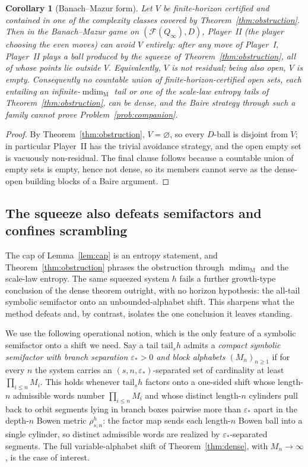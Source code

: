 \documentclass[11pt]{article}
\newtheorem{corollary}[theorem]{Corollary}
\newcommand{\Q}{Q_\infty}
\newcommand{\F}{\mathcal{F}}
\newcommand{\mdim}{\operatorname{mdim}_{\mathrm M}}
\begin{document}
\begin{corollary}[Banach--Mazur form]\label{cor:bm}
Let $V$ be finite-horizon certified and contained in one of the complexity classes covered
by Theorem~\ref{thm:obstruction}.  Then in the Banach--Mazur game on
$(\F(\Q),D)$, Player~II (the player choosing the even moves) can avoid $V$ entirely:
after any move of Player~I, Player~II plays a ball produced by the squeeze of
Theorem~\ref{thm:obstruction}, all of whose points lie outside $V$.  Equivalently,
$V$ is not residual; being also open, $V$ is empty.  Consequently no countable
union of finite-horizon-certified open sets, each entailing an infinite-\(\mdim\) tail or
one of the scale-law entropy tails of Theorem~\ref{thm:obstruction}, can be dense, and the
Baire strategy through such a family cannot prove Problem~\ref{prob:companion}.
\end{corollary}

\begin{proof}
By Theorem~\ref{thm:obstruction}, $V=\varnothing$, so every $D$-ball is disjoint from
$V$; in particular Player~II has the trivial avoidance strategy, and the open empty set
is vacuously non-residual.  The final clause follows because a countable union of empty
sets is empty, hence not dense, so its members cannot serve as the dense-open building
blocks of a Baire argument.
\end{proof}

\subsection*{The squeeze also defeats semifactors and confines scrambling}

The cap of Lemma~\ref{lem:cap} is an entropy statement, and Theorem~\ref{thm:obstruction}
phrases the obstruction through $\mdim$ and the scale-law entropy.  The same squeezed
system $h$ fails a further growth-type conclusion of the dense theorem outright, with no
horizon hypothesis: the all-tail symbolic semifactor onto an unbounded-alphabet shift.
This sharpens what the method defeats and, by contrast, isolates the one conclusion it
leaves standing.

We use the following operational notion, which is the only feature of a symbolic
semifactor onto a shift we need.  Say a tail $\mathrm{tail}_sh$ admits a \emph{compact
symbolic semifactor with branch separation $\varepsilon_*>0$ and block alphabets
$(M_n)_{n\ge1}$} if for every $n$ the system carries an $(s,n,\varepsilon_*)$-separated
set of cardinality at least $\prod_{i\le n}M_i$.  This holds whenever $\mathrm{tail}_sh$
factors onto a one-sided shift whose length-$n$ admissible words number
$\prod_{i\le n}M_i$ and whose distinct length-$n$ cylinders pull back to orbit segments
lying in branch boxes pairwise more than $\varepsilon_*$ apart in the depth-$n$ Bowen
metric $\rho^h_{s,n}$: the factor map sends each length-$n$ Bowen ball into a single
cylinder, so distinct admissible words are realized by $\varepsilon_*$-separated segments.
The full variable-alphabet shift of Theorem~\ref{thm:dense}, with $M_n\to\infty$, is the
case of interest.
\end{document}
